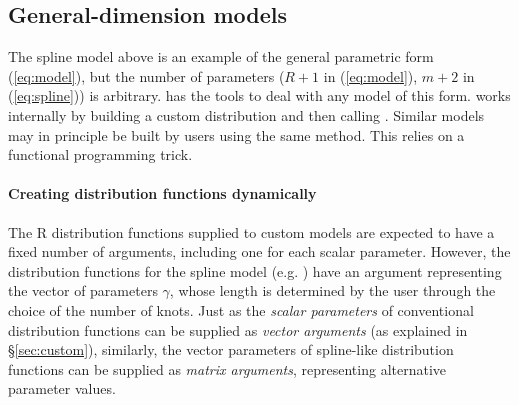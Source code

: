 \documentclass[nojss,nofooter]{jss}
\begin{document}
\subsection{General-dimension models}
\label{sec:gdim}

The spline model above is an example of the general parametric form
(\ref{eq:model}), but the number of parameters ($R+1$ in
(\ref{eq:model}), $m+2$ in (\ref{eq:spline})) is arbitrary.
 has the tools to deal with any model of this form.
 works internally by building a custom
distribution and then calling .  Similar models may
in principle be built by users using the same method.  This relies on
a functional programming trick.

\paragraph{Creating distribution functions dynamically}

The R distribution functions supplied to custom models are expected to
have a fixed number of arguments, including one for each scalar
parameter.  However, the distribution functions for the spline model
(e.g. ) have an argument  representing
the vector of parameters $\gamma$, whose length is determined by the
user through the choice of the number of knots.  Just as the
\emph{scalar parameters} of conventional distribution functions can be
supplied as \emph{vector arguments} (as explained in
\S\ref{sec:custom}), similarly, the vector parameters of spline-like
distribution functions can be supplied as \emph{matrix arguments},
representing alternative parameter values.
\end{document}
